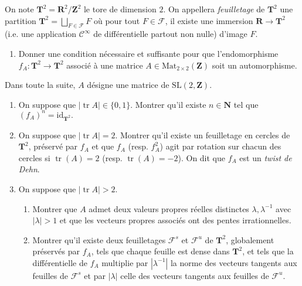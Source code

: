 \documentclass[a4paper,10pt,openany]{article}
\theoremstyle{plain}
\theoremstyle{definition}
\newcommand{\T}{\mathbf{T}}
\newcommand{\R}{\mathbf{R}}
\newcommand{\Z}{\mathbf{Z}}
\newcommand{\N}{\mathbf{N}}
\newcommand{\F}{\mathcal{F}}
\DeclareMathOperator{\tr}{tr}
\newcommand{\id}{\mathrm{id}}
\begin{document}
\noindent On note $\T^2 = \R^2/\Z^2$ le tore de dimension $2$. On appellera \textit{feuilletage} de $\T^2$ une partition $\T^2 = \bigsqcup_{F \in \F} F$ o\`u pour tout $F \in \mathcal{F}$, il existe une immersion $\R \to \T^2$ (i.e. une application $\mathcal{C}^\infty$ de diff\'erentielle partout non nulle) d'image $F$. 
\begin{enumerate}
\item Donner une condition n\'ecessaire et suffisante pour que l'endomorphisme $f_A : \T^2 \to \T^2$ associ\'e \`a une matrice $A \in \mathrm{Mat}_{2\times 2}(\Z)$ soit un automorphisme.
\end{enumerate}
Dans toute la suite, $A$ d\'esigne une matrice de $\mathrm{SL}(2,\Z)$.
\begin{enumerate}[resume]
\item On suppose que $|{\tr  A}| \in \{0,1\}$. Montrer qu'il existe $n \in \N$ tel que $(f_A)^n = \id_{\T^2}.$
\item On suppose que $|{\tr A}| = 2.$ Montrer qu'il existe un feuilletage en cercles de $\T^2$, pr\'eserv\'e par $f_A$ et que $f_A$ (resp. $f_A^2$) agit par rotation sur chacun des cercles si $\tr(A) = 2$ (resp. $\tr(A) = -2$). On dit que $f_A$ est un \textit{twist de Dehn}.
\item On suppose que $|{\tr A}| > 2$.
\begin{enumerate}
\item Montrer que $A$ admet deux valeurs propres r\'eelles distinctes $\lambda, \lambda^{-1}$ avec $|\lambda| > 1$ et que les vecteurs propres associ\'es ont des pentes irrationnelles.
\item Montrer qu'il existe deux feuilletages $\F^s$ et $\F^u$ de $\T^2$, globalement pr\'eserv\'es par $f_A$, tels que chaque feuille est dense dans $\T^2$, et tels que la diff\'erentielle de $f_A$ multiplie par $\left|\lambda^{-1}\right|$ la norme des vecteurs tangents aux feuilles de $\F^s$ et par $|\lambda|$ celle des vecteurs tangents aux feuilles de $\F^u$. 

\end{enumerate}
\end{enumerate}
\hfill \break 

 \\ 
\end{document}
